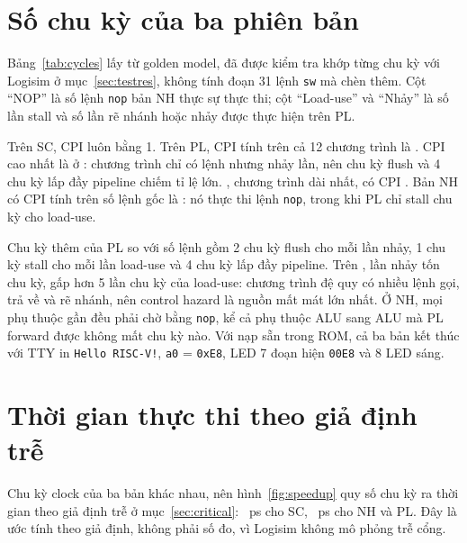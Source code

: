 \documentclass[../report.tex]{subfiles}
\begin{document}
\section{Số chu kỳ của ba phiên bản}

Bảng~\ref{tab:cycles} lấy từ golden model, đã được kiểm tra khớp từng chu kỳ với Logisim ở mục~\ref{sec:testres},
không tính đoạn 31 lệnh \texttt{sw} mà  chèn thêm. Cột ``NOP'' là số lệnh \texttt{nop} bản NH
thực sự thực thi; cột ``Load-use'' và ``Nhảy'' là số lần stall và số lần rẽ nhánh hoặc nhảy được thực hiện trên PL.

\begin{table}[!htb]
\centering\small
\caption{Số lệnh và số chu kỳ trên SC, NH và PL}\label{tab:cycles}
\setlength{\tabcolsep}{4.5pt}

\end{table}

Trên SC, CPI luôn bằng 1. Trên PL, CPI tính trên cả 12 chương trình là \resTotCPI. CPI cao nhất là \resMaxCPI{}
ở \resMaxProg: chương trình chỉ có \resMaxN{} lệnh nhưng nhảy \resMaxBR{} lần, nên \resMaxFlush{} chu kỳ flush
và 4 chu kỳ lấp đầy pipeline chiếm tỉ lệ lớn. , chương trình dài nhất, có CPI
\resNineCPI. Bản NH có CPI tính trên số lệnh gốc là \resTotCPINH: nó thực thi \resTotNOP{} lệnh \texttt{nop},
trong khi PL chỉ stall \resTotLU{} chu kỳ cho load-use.

Chu kỳ thêm của PL so với số lệnh gồm 2 chu kỳ flush cho mỗi lần nhảy, 1 chu kỳ stall cho mỗi lần load-use và 4
chu kỳ lấp đầy pipeline. Trên , \resNineBR{} lần nhảy tốn \resNineFlush{} chu kỳ, gấp hơn 5
lần \resNineLU{} chu kỳ của load-use: chương trình đệ quy có nhiều lệnh gọi, trả về và rẽ nhánh, nên control hazard
là nguồn mất mát lớn nhất. Ở NH, mọi phụ thuộc gần đều phải chờ bằng \texttt{nop}, kể cả phụ thuộc ALU sang ALU mà
PL forward được không mất chu kỳ nào. Với  nạp sẵn trong ROM, cả ba bản kết thúc với TTY in
\texttt{Hello RISC-V!}, \texttt{a0} = \texttt{0xE8}, LED 7 đoạn hiện \texttt{00E8} và 8 LED sáng.

\section{Thời gian thực thi theo giả định trễ}

Chu kỳ clock của ba bản khác nhau, nên hình~\ref{fig:speedup} quy số chu kỳ ra thời gian theo giả định trễ ở
mục~\ref{sec:critical}: \resTSingle~ps cho SC, \resTPipe~ps cho NH và PL. Đây là ước tính theo giả định, không
phải số đo, vì Logisim không mô phỏng trễ cổng.
\end{document}
